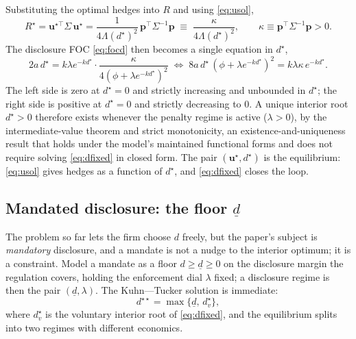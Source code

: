 \documentclass[11pt,a4paper]{article}
\begin{document}
Substituting the optimal hedges into $R$ and using \eqref{eq:usol},
\begin{equation}
R^\star=\mathbf{u}^{\star\top}\Sigma\,\mathbf{u}^\star=\frac{1}{4\Lambda(d^\star)^2}\,\mathbf{p}^\top\Sigma^{-1}\mathbf{p}\;\equiv\;\frac{\kappa}{4\Lambda(d^\star)^2},\qquad \kappa\equiv\mathbf{p}^\top\Sigma^{-1}\mathbf{p}>0.
\label{eq:Rstar}
\end{equation}
The disclosure FOC \eqref{eq:focd} then becomes a single equation in $d^\star$,
\begin{equation}
2a\,d^\star=k\lambda e^{-kd^\star}\cdot\frac{\kappa}{4(\phi+\lambda e^{-kd^\star})^2}
\;\Longleftrightarrow\;
8a\,d^\star\,(\phi+\lambda e^{-kd^\star})^2=k\lambda\kappa\,e^{-kd^\star}.
\label{eq:dfixed}
\end{equation}
The left side is zero at $d^\star=0$ and strictly increasing and unbounded in $d^\star$; the right side is positive at $d^\star=0$ and strictly decreasing to $0$. A unique interior root $d^\star>0$ therefore exists whenever the penalty regime is active ($\lambda>0$), by the intermediate-value theorem and strict monotonicity, an existence-and-uniqueness result that holds under the model's maintained functional forms and does not require solving \eqref{eq:dfixed} in closed form. The pair $(\mathbf u^\star,d^\star)$ is the equilibrium: \eqref{eq:usol} gives hedges as a function of $d^\star$, and \eqref{eq:dfixed} closes the loop.

\subsection{Mandated disclosure: the floor $\underline{d}$}
\label{sec:floor}

The problem so far lets the firm choose $d$ freely, but the paper's subject is \emph{mandatory} disclosure, and a mandate is not a nudge to the interior optimum; it is a constraint. Model a mandate as a floor $d\ge\underline{d}\ge0$ on the disclosure margin the regulation covers, holding the enforcement dial $\lambda$ fixed; a disclosure regime is then the pair $(\underline{d},\lambda)$. The Kuhn---Tucker solution is immediate:
\begin{equation}
d^{\star\star}=\max\{\underline{d},\,d^\star_v\},
\label{eq:floor}
\end{equation}
where $d^\star_v$ is the voluntary interior root of \eqref{eq:dfixed}, and the equilibrium splits into two regimes with different economics.
\end{document}

